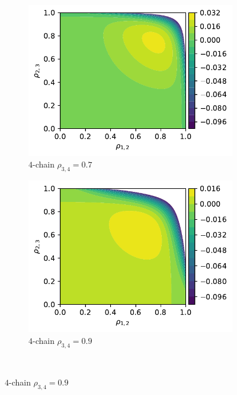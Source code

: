 \documentclass[../Thesis.tex]{subfiles}
\begin{document}
\begin{figure}[h]
    \centering
    \begin{subfigure}[t]{0.49\textwidth}
        \centering
        \includegraphics[width=.95\linewidth]{figures/Gaussian Chain Theoretical/3 chain error - MI - rho3 0_7.pdf}
        \caption{$4$-chain $\rho_{3,4} = 0.7$}
    \end{subfigure}
    \hfill
    \begin{subfigure}[t]{0.49\textwidth}
        \centering
        \includegraphics[width=.95\linewidth]{figures/Gaussian Chain Theoretical/3 chain error - MI - rho3 0_9.pdf}
        \caption{$4$-chain $\rho_{3,4} = 0.9$}
    \end{subfigure}
    \\[\baselineskip]

\end{figure}
\end{document}
